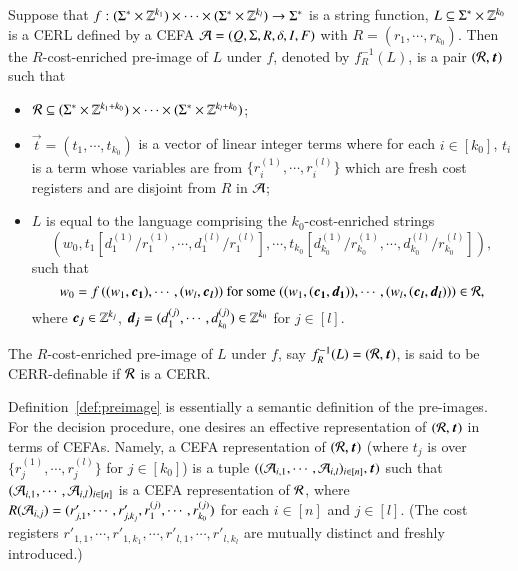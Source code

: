 \begin{definition} \label{def:preimage}
Suppose that $f: (\Sigma^* \times \mathbb{Z}^{k_1}) \times \cdots \times (\Sigma^* \times \mathbb{Z}^{k_l}) \rightarrow \Sigma^*$ is a string function, $L \subseteq \Sigma^* \times \mathbb{Z}^{k_0}$ is a CERL defined by a CEFA $\mathcal{A}=(Q, \Sigma, R, \delta, I, F)$ with $R= (r_1, \cdots, r_{k_0})$. Then the $R$-cost-enriched pre-image of $L$ under $f$, denoted by $f^{-1}_R(L)$, is a pair $(\cR, \vec{t})$ such that 
\begin{itemize}
\item $\mathcal{R} \subseteq (\Sigma^* \times \mathbb{Z}^{k_1 + k_0}) \times \cdots \times (\Sigma^* \times \mathbb{Z}^{k_l + k_0})$;
\item $\vec{t} = (t_1, \cdots ,t_{k_0})$ is a vector of linear integer terms where for each $i \in [k_0]$, $t_i$ is a term whose variables are from $\{r^{(1)}_i, \cdots, r^{(l)}_i\}$ which are fresh cost registers and are disjoint from $R$ in $\mathcal{A}$;

\item $L$ is equal to the language comprising the $k_0$-cost-enriched strings
%
\[\left(w_0, t_1\left[d^{(1)}_{1}/r^{(1)}_1, \cdots, d^{(l)}_{1}/r^{(l)}_1\right], \cdots, t_{k_0}\left[d^{(1)}_{k_0}/r^{(1)}_{k_0}, \cdots, d^{(l)}_{k_0}/r^{(l)}_{k_0}\right]
\right), \]
%
such that 
\[w_0 = f\left((w_1, \vec{c_1}), \cdots, (w_l, \vec{c_l}\right)) \mbox{ for some } ((w_1, (\vec{c_1}, \vec{d_1})), \cdots, (w_l, (\vec{c_l}, \vec{d_l}))) \in \cR,\]
where $\vec{c_j} \in \Int^{k_j}$, $\vec{d_j} = (d^{(j)}_{1}, \cdots, d^{(j)}_{k_0}) \in \Int^{k_0}$ for $j\in [l]$.
%
\end{itemize}
The $R$-cost-enriched pre-image of $L$ under $f$, say $f^{-1}_R(L)=(\cR, \vec{t})$, is said to be CERR-definable if $\mathcal{R}$ is a CERR. 
\end{definition}

Definition~\ref{def:preimage} is essentially a semantic definition of the pre-images. For the decision procedure, one desires an effective representation of $(\cR, \vec{t})$ in terms of CEFAs. Namely,
a CEFA representation of %
$(\cR, \vec{t})$ (where $t_j$ is over $\{r^{(1)}_j, \cdots, r^{(l)}_j\}$ for $j\in [k_0]$)
is a tuple $((\CEFA_{i,1}, \cdots, \CEFA_{i, l})_{i \in [n]}, \vec{t})$ such that $(\mathcal{A}_{i,1}, \cdots, \mathcal{A}_{i, l})_{i \in [n]}$ is a CEFA representation of $\mathcal{R}$, where $R(\mathcal{A}_{i,j})=(r'_{j,1}, \cdots, r'_{j,k_j}, r^{(j)}_1, \cdots,r^{(j)}_{k_0})$ for each $i \in [n]$ and $j \in [l]$. (The cost registers $r'_{1,1}, \cdots, r'_{1,k_1},\cdots, r'_{l,1}, \cdots, r'_{l,k_l}$ %
are mutually distinct and freshly introduced.) %


